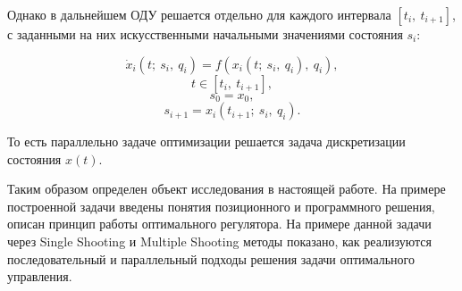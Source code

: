 Однако в дальнейшем ОДУ решается отдельно для каждого интервала $[t_i,~t_{i+1}]$, с заданными на них искусственными начальными значениями состояния $s_i$:


\[\dot x_i(t;~s_i,~q_i) = f(x_i(t;~s_i,~q_i), ~q_i),\]
\[t \in [t_i,~t_{i+1}],\]
\[s_0 = x_0,\]
\[s_{i+1} = x_i(t_{i+1};~s_i,~q_i).\]


То есть параллельно задаче оптимизации решается задача дискретизации состояния $x(t)$. 

\newpage
Таким образом определен объект исследования в настоящей работе. На примере построенной задачи введены понятия позиционного и программного решения, описан принцип работы оптимального регулятора. На примере данной задачи через Single Shooting и Multiple Shooting методы показано, как реализуются последовательный и параллельный подходы решения задачи оптимального управления.
